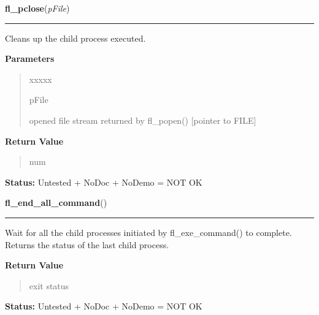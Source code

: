 \hspace{.8\funcindent}\begin{boxedminipage}{\funcwidth}

    \raggedright \textbf{fl\_pclose}(\textit{pFile})

    \vspace{-1.5ex}

    \rule{\textwidth}{0.5\fboxrule}
\setlength{\parskip}{2ex}
    Cleans up the child process executed.

\setlength{\parskip}{1ex}
      \textbf{Parameters}
      \vspace{-1ex}

      \begin{quote}
        \begin{Ventry}{xxxxx}

          \item[pFile]

          opened file stream returned by fl\_popen() [pointer to FILE]

        \end{Ventry}

      \end{quote}

      \textbf{Return Value}
    \vspace{-1ex}

      \begin{quote}
      num

      \end{quote}

\textbf{Status:} Untested + NoDoc + NoDemo = NOT OK



    \end{boxedminipage}

    \label{xformslib:library:fl_end_all_command}

    \vspace{0.5ex}

\hspace{.8\funcindent}\begin{boxedminipage}{\funcwidth}

    \raggedright \textbf{fl\_end\_all\_command}()

    \vspace{-1.5ex}

    \rule{\textwidth}{0.5\fboxrule}
\setlength{\parskip}{2ex}
    Wait for all the child processes initiated by fl\_exe\_command() to 
    complete. Returns the status of the last child process.

\setlength{\parskip}{1ex}
      \textbf{Return Value}
    \vspace{-1ex}

      \begin{quote}
      exit status

      \end{quote}

\textbf{Status:} Untested + NoDoc + NoDemo = NOT OK



    \end{boxedminipage}

